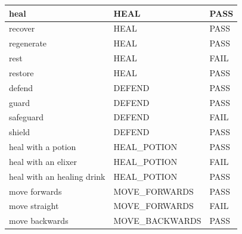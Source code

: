 \documentclass[11pt]{article}
\begin{document}
\begin{table}[]
\begin{tabular}{lll}
\multicolumn{1}{l|}{heal}                           & \multicolumn{1}{l|}{HEAL}               & \cellcolor[HTML]{67FD9A}PASS \\ \hline
\multicolumn{1}{l|}{recover}                        & \multicolumn{1}{l|}{HEAL}               & \cellcolor[HTML]{67FD9A}PASS \\ \hline
\multicolumn{1}{l|}{regenerate}                     & \multicolumn{1}{l|}{HEAL}               & \cellcolor[HTML]{67FD9A}PASS \\ \hline
\multicolumn{1}{l|}{rest}                           & \multicolumn{1}{l|}{HEAL}               & \cellcolor[HTML]{FD6864}FAIL \\ \hline
\multicolumn{1}{l|}{restore}                           & \multicolumn{1}{l|}{HEAL}               & \cellcolor[HTML]{67FD9A}PASS \\ \hline
\multicolumn{1}{l|}{defend}                           & \multicolumn{1}{l|}{DEFEND}               & \cellcolor[HTML]{67FD9A}PASS \\ \hline
\multicolumn{1}{l|}{guard}                           & \multicolumn{1}{l|}{DEFEND}               & \cellcolor[HTML]{67FD9A}PASS \\ \hline
\multicolumn{1}{l|}{safeguard}                           & \multicolumn{1}{l|}{DEFEND}               & \cellcolor[HTML]{FD6864}FAIL \\ \hline
\multicolumn{1}{l|}{shield}                           & \multicolumn{1}{l|}{DEFEND}               & \cellcolor[HTML]{67FD9A}PASS \\ \hline
\multicolumn{1}{l|}{heal with a potion}             & \multicolumn{1}{l|}{HEAL\_POTION}       & \cellcolor[HTML]{67FD9A}PASS \\ \hline
\multicolumn{1}{l|}{heal with an elixer}            & \multicolumn{1}{l|}{HEAL\_POTION}       & \cellcolor[HTML]{FD6864}FAIL \\ \hline
\multicolumn{1}{l|}{heal with an healing drink}     & \multicolumn{1}{l|}{HEAL\_POTION}       & \cellcolor[HTML]{67FD9A}PASS \\ \hline
\multicolumn{1}{l|}{move forwards}                  & \multicolumn{1}{l|}{MOVE\_FORWARDS}     & \cellcolor[HTML]{67FD9A}PASS \\ \hline
\multicolumn{1}{l|}{move straight}                  & \multicolumn{1}{l|}{MOVE\_FORWARDS}     & \cellcolor[HTML]{FD6864}FAIL \\ \hline
\multicolumn{1}{l|}{move backwards}                 & \multicolumn{1}{l|}{MOVE\_BACKWARDS}    & \cellcolor[HTML]{67FD9A}PASS \\ \hline

\end{tabular}
\end{table}
\end{document}

